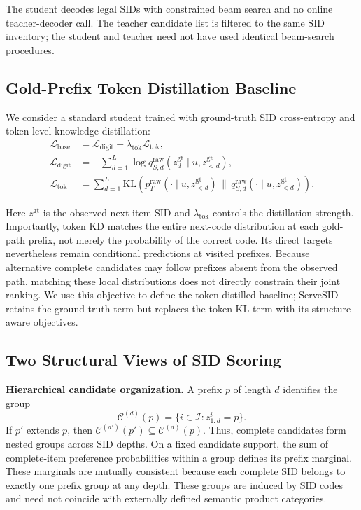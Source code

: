 \documentclass[sigconf, anonymous, review]{acmart}
\newcommand{\KL}{\mathrm{KL}}
\begin{document}
The student decodes legal SIDs with constrained beam search
and no online teacher-decoder call. The teacher candidate list
is filtered to the same SID inventory; the student and teacher
need not have used identical beam-search procedures.

\subsection{Gold-Prefix Token Distillation Baseline}
\label{sec:prelim-base}

We consider a standard student trained with ground-truth SID
cross-entropy and token-level knowledge distillation:
\begin{equation}
\begin{aligned}
\mathcal L_{\mathrm{base}}
&=\mathcal L_{\mathrm{digit}}
+\lambda_{\mathrm{tok}}\mathcal L_{\mathrm{tok}},\\
\mathcal L_{\mathrm{digit}}
&=-\sum_{d=1}^{L}\log q_{S,d}^{\mathrm{raw}}(z_d^{\mathrm{gt}}\mid u,z_{<d}^{\mathrm{gt}}),\\
\mathcal L_{\mathrm{tok}}
&=\sum_{d=1}^{L}\KL\!\left(
p_T^{\mathrm{raw}}(\cdot\mid u,z_{<d}^{\mathrm{gt}})
\,\|\,
q_{S,d}^{\mathrm{raw}}(\cdot\mid u,z_{<d}^{\mathrm{gt}})
\right).
\end{aligned}
\label{eq:base-obj}
\end{equation}

Here $z^{\mathrm{gt}}$ is the observed next-item SID and
$\lambda_{\mathrm{tok}}$ controls the distillation strength.
Importantly, token KD matches the entire next-code distribution at
each gold-path prefix, not merely the probability of the correct code.
Its direct targets nevertheless remain conditional predictions at
visited prefixes. Because alternative complete candidates may follow
prefixes absent from the observed path, matching these local
distributions does not directly constrain their joint ranking. We use
this objective to define the token-distilled baseline; ServeSID
retains the ground-truth term but replaces the token-KL term with its
structure-aware objectives.

\subsection{Two Structural Views of SID Scoring}
\label{sec:prelim-structure}

\textbf{Hierarchical candidate organization.} A prefix $p$ of length
$d$ identifies the group
\begin{equation}
\mathcal C^{(d)}(p)=\{i\in\mathcal I:z_{1:d}^{i}=p\}.
\label{eq:prefix-group}
\end{equation}
If $p'$ extends $p$, then
$\mathcal C^{(d')}(p')\subseteq\mathcal C^{(d)}(p)$. Thus, complete
candidates form nested groups across SID depths. On a fixed candidate
support, the sum of complete-item preference probabilities within a
group defines its prefix marginal. These marginals are mutually
consistent because each complete SID belongs to exactly one prefix
group at any depth. These groups are induced by SID codes and need not
coincide with externally defined semantic product categories.
\end{document}
